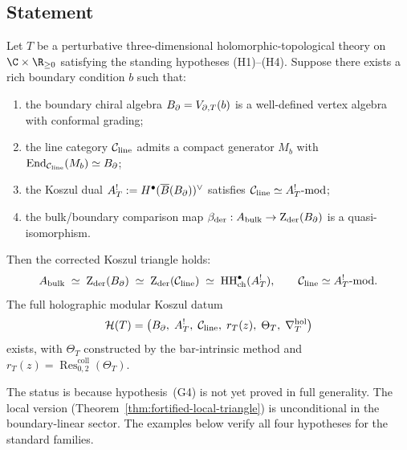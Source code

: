 \subsection{Statement}

\begin{conjecture}
Let $T$ be a perturbative three-dimensional holomorphic-topological
theory on $\C\times\R_{\ge 0}$ satisfying the standing hypotheses
\textup{(H1)--(H4)}. Suppose there exists a rich boundary
condition $b$ such that:
\begin{enumerate}[label=\textup{(G\arabic*)},leftmargin=2.2em]
\item the boundary chiral algebra $B_{\partial}=V_{\partial,T}(b)$ is
a well-defined vertex algebra with conformal grading;
\item the line category $\mathcal C_{\mathrm{line}}$ admits a compact
generator $M_b$ with $\operatorname{End}_{\mathcal C_{\mathrm{line}}}(M_b)\simeq B_{\partial}$;
\item the Koszul dual $A^!_T := H^\bullet(\overline{B}(B_{\partial}))^\vee$
satisfies $\mathcal C_{\mathrm{line}}\simeq A^!_T\text{-mod}$;
\item the bulk/boundary comparison map
$\beta_{\mathrm{der}}:A_{\mathrm{bulk}}\to\operatorname{Z}_{\mathrm{der}}(B_{\partial})$
is a quasi-isomorphism.
\end{enumerate}
Then the corrected Koszul triangle holds:
\begin{equation}%
\Abulk
\;\simeq\;
\Zder(\Bbound)
\;\simeq\;
\Zder(\cC_{\mathrm{line}})
\;\simeq\;
\HH^\bullet_{\mathrm{ch}}(A^!_T),
\qquad
\cC_{\mathrm{line}}\simeq A^!_T\text{-mod}.
\end{equation}
The full holographic modular Koszul datum
\[
\mathcal{H}(T)
= \bigl(
B_{\partial},\;A^!_T,\;\mathcal C_{\mathrm{line}},\;
r_T(z),\;\Theta_T,\;\nabla^{\mathrm{hol}}_T
\bigr)
\]
exists, with $\Theta_T$ constructed by the bar-intrinsic method
and $r_T(z)=\operatorname{Res}^{\mathrm{coll}}_{0,2}(\Theta_T)$.
\end{conjecture}

\begin{remark}
The status is \ClaimStatusConjectured{} because hypothesis~(G4)
is not yet proved in full generality. The local version
(Theorem~\ref{thm:fortified-local-triangle}) is unconditional in
the boundary-linear sector. The examples below verify all four
hypotheses for the standard families.
\end{remark}


